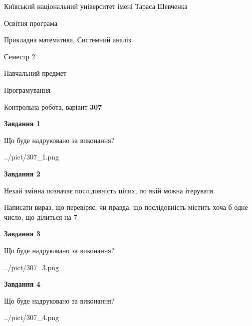 \documentclass[12pt, ukrainian]{article}
\begin{document}
{{\begin {small}\par
{ \center  Київський національний університет імені Тараса Шевченка \par}
{\parbox {5 cm}{Освітня програма \hfill}{\parbox {8 cm}{Прикладна математика, Системний аналіз \hfill}}\parbox {5 cm}{\hfill Семестр 2}}\par
{\parbox {5 cm} {Навчальний предмет \hfill}\parbox {7 cm}{Програмування \hfill}\parbox {6cm}{\hfill}\par}\vspace{-7pt} \end{small}}{\center Контрольна робота, варіант  \No \textbf
{ 307 }\par}}
{
\begin {large}
{\begin {center}\textbf{Завдання 1}\end {center}}\par
Що буде надруковано за виконання?\par\par
\begin{center}
	{../pict/307_1.png}
\end{center}
\newpage

{\begin {center}\textbf{Завдання 2}\end {center}}\par
Нехай змінна  позначає послідовність цілих, по якій можна ітерувати.

Написати вираз, що перевіряє, чи правда, що послідовність  містить хоча б одне число, що ділиться на 7.\par
\newpage

{\begin {center}\textbf{Завдання 3}\end {center}}\par
Що буде надруковано за виконання?
\begin{center}
	{../pict/307_3.png}
\end{center}
\newpage

{\begin {center}\textbf{Завдання 4}\end {center}}\par
Що буде надруковано за виконання?\par
\begin{center}
	{../pict/307_4.png}
\end{center}
\newpage


\end{large}}
\end{document}

